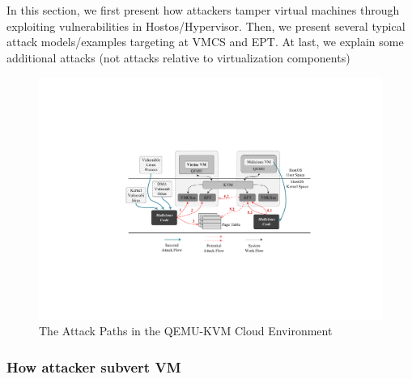 In this section, we first present how attackers tamper virtual machines through exploiting vulnerabilities in Hostos/Hypervisor. Then, we present several typical attack models/examples targeting at VMCS and EPT. At last, we explain some additional attacks (not attacks relative to virtualization components)

\begin{figure}[htpb]
    \centering
    \includegraphics[width=1\linewidth]{IMG/threat.pdf}
    \caption{The Attack Paths in the QEMU-KVM Cloud Environment}%
    \label{fig:threat}
\end{figure}


\subsubsection{How attacker subvert VM}

